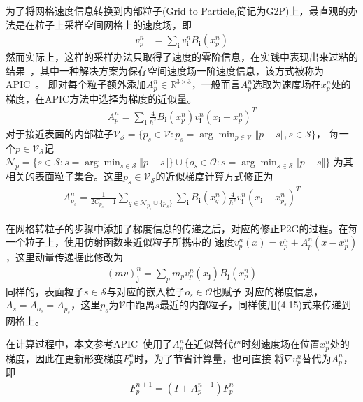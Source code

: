 为了将网格速度信息转换到内部粒子(Grid to Particle,简记为G2P)上，最直观的办法是在粒子上采样空间网格上的速度场，即
\begin{align}
    v_p^n &= \sum_{\mathbf{i}} v_{\mathbf{i}}^n B_{\mathbf{i}}(x_p^n)
\end{align}
然而实际上，这样的采样办法只取得了速度的零阶信息，在实践中表现出来过粘的结果~\cite{tskhakaya2007particle}，其中一种解决方案为保存空间速度场一阶速度信息，该方式被称为APIC~\cite{jiang2015affine}。
即对每个粒子额外添加$A_p^n \in \mathbb{R}^{3\times 3}$，一般而言$A_p^n$选取为速度场在$x_p^n$处的梯度，在APIC方法中选择为梯度的近似量。
\begin{align}
    A_p^n = \sum_{\mathbf{i}} \frac{4}{h^2}B_{\mathbf{i}}(x_p^n)v_{\mathbf{i}}^n(x_\mathbf{i} - x_p^n)^T
\end{align}
对于接近表面的内部粒子$\mathcal{V}_{\mathcal{S}} = \{p_s \in \mathcal{V}:p_s = \arg\min_{p \in \mathcal{V}} \Vert p - s\Vert, s\in \mathcal{S}\}$，
每一个$p\in \mathcal{V}_{\mathcal{S}}$记$\mathcal{N}_{p} = \{s\in \mathcal{S}:s = \arg\min_{s\in \mathcal{S}}\Vert p - s\Vert\}\cup \{o_s \in \mathcal{O}:s = \arg\min_{s\in \mathcal{S}}\Vert p - s\Vert\}$
为其相关的表面粒子集合。这里$p_s \in \mathcal{V}_\mathcal{S}$的近似梯度计算方式修正为
\begin{align}
    A_{p_s}^n = \frac{1}{2C_{p_s} + 1}\sum_{q \in \mathcal{N}_{p_s}\cup \{p_s\}}\sum_{\mathbf{i}} B_{\mathbf{i}}(x_q^n)\frac{4}{h^2}v_{\mathbf{i}}^n(x_\mathbf{i} - x_{p_s}^n)^T
\end{align}

在网格转粒子的步骤中添加了梯度信息的传递之后，对应的修正P2G的过程。在每一个粒子上，使用仿射函数来近似粒子所携带的
速度$v_p^n(x) = v_p^n + A_p^n(x - x_p^n)$，这里动量传递据此修改为
\begin{align}
    (mv)_{\mathbf{j}}^n = \sum_{p}m_pv_p^n(x_\mathbf{j})B_{\mathbf{j}}(x_p^n)
\end{align}
同样的，表面粒子$s\in \mathcal{S}$与对应的嵌入粒子$o_s \in \mathcal{O}$也赋予
对应的梯度信息，$A_s = A_{o_s} = A_{p_s}$，这里$p_s$为$\mathcal{V}$中距离$s$最近的内部粒子，同样使用(4.15)式来传递到网格上。

在计算过程中，本文参考APIC~\cite{jiang2015affine}使用了$A_p^n$在近似替代$t^n$时刻速度场在位置$x_p^n$处的梯度，因此在更新形变梯度$F^n_p$时，为了节省计算量，也可直接
将$\nabla v^n_p$替代为$A_p^n$，即
\begin{align}
    F_p^{n+1} = (I + A_p^{n+1})F_p^n
\end{align}
